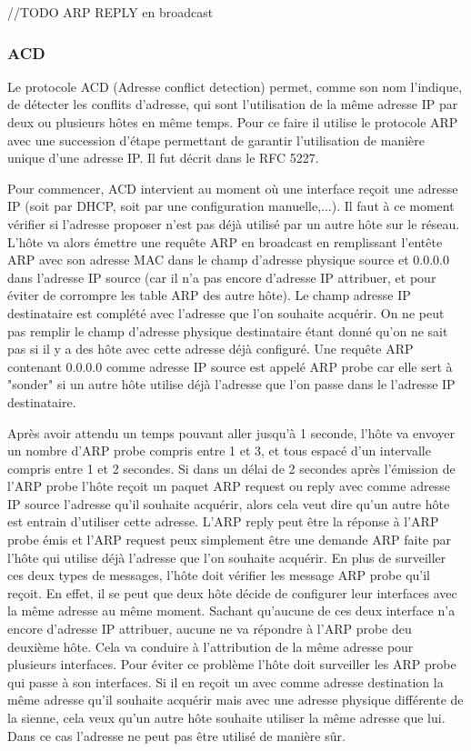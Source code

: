 //TODO ARP REPLY en broadcast

\subsubsection{ACD} Le protocole ACD (Adresse conflict detection) permet, comme
son nom l'indique, de détecter les conflits d'adresse, qui sont l'utilisation
de la même adresse IP par deux ou plusieurs hôtes en même temps. Pour ce faire
il utilise le protocole ARP avec une succession d'étape permettant de garantir
l'utilisation de manière unique d'une adresse IP. Il fut décrit dans le RFC 5227\cite{url-RFC-ACD}.

Pour commencer, ACD intervient au moment où une interface reçoit une adresse IP
(soit par DHCP, soit par une configuration manuelle,...). Il faut à ce moment vérifier si
l'adresse proposer n'est pas déjà utilisé par un autre hôte sur le réseau.
L'hôte va alors émettre une requête ARP en broadcast en remplissant l'entête
ARP avec son adresse MAC dans le champ d'adresse physique source et 0.0.0.0
dans l'adresse IP source (car il n'a pas encore d'adresse IP attribuer, et pour
éviter de corrompre les table ARP des autre hôte). Le champ adresse IP
destinataire est complété avec l'adresse que l'on souhaite acquérir. On ne peut
pas remplir le champ d'adresse physique destinataire étant donné qu'on ne sait
pas si il y a des hôte avec cette adresse déjà configuré.  Une requête ARP
contenant 0.0.0.0 comme adresse IP source est appelé ARP probe car elle sert à
"sonder" si un autre hôte utilise déjà l'adresse que l'on passe dans le
l'adresse IP destinataire.

Après avoir attendu un temps pouvant aller jusqu'à 1 seconde, l'hôte va envoyer
un nombre d'ARP probe compris entre 1 et 3, et tous espacé d'un intervalle
compris entre 1 et 2 secondes.  Si dans un délai de 2 secondes après l'émission
de l'ARP probe l'hôte reçoit un paquet ARP request ou reply avec comme adresse
IP source l'adresse qu'il souhaite acquérir, alors cela veut dire qu'un autre
hôte est entrain d'utiliser cette adresse. L'ARP reply peut être la réponse à
l'ARP probe émis et l'ARP request peux simplement être une demande ARP faite
par l'hôte qui utilise déjà l'adresse que l'on souhaite acquérir.  En plus de
surveiller ces deux types de messages, l'hôte doit vérifier les message ARP
probe qu'il reçoit. En effet, il se peut que deux hôte décide de configurer
leur interfaces avec la même adresse au même moment. Sachant qu'aucune de ces
deux interface n'a encore d'adresse IP attribuer, aucune ne va répondre à l'ARP
probe deu deuxième hôte. Cela va conduire à l'attribution de la même adresse
pour plusieurs interfaces. Pour éviter ce problème l'hôte doit surveiller les
ARP probe qui passe à son interfaces. Si il en reçoit un avec comme adresse
destination la même adresse qu'il souhaite acquérir mais avec une adresse
physique différente de la sienne, cela veux qu'un autre hôte souhaite utiliser
la même adresse que lui. Dans ce cas l'adresse ne peut pas être utilisé de manière sûr.

